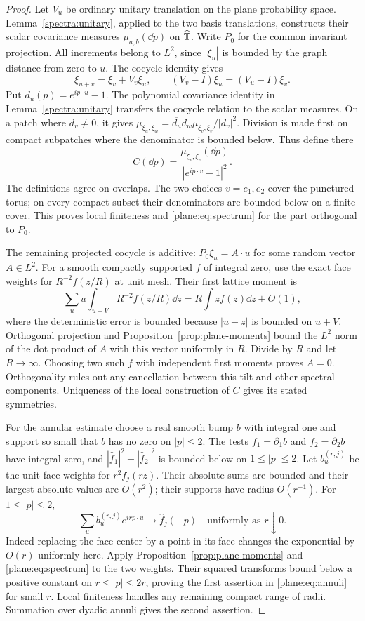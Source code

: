 \begin{proof}
Let $V_u$ be ordinary unitary translation on the plane probability space.
Lemma~\ref{spectra:unitary}, applied to the two basis translations,
constructs their scalar covariance measures $\mu_{a,b}(\dd p)$ on
$\widehat{\mathbb T}$.  Write $P_0$ for the common invariant projection.
All increments belong to $L^2$, since
$|\xi_u|$ is bounded by the graph distance from zero to $u$.  The cocycle
identity gives
\[
 \xi_{u+v}=\xi_v+V_v\xi_u,
 \qquad (V_v-I)\xi_u=(V_u-I)\xi_v.
\]
Put $d_u(p)=e^{ip\cdot u}-1$.  The polynomial covariance identity in
Lemma~\ref{spectra:unitary} transfers the cocycle relation to the scalar
measures.  On a patch where $d_v\ne0$, it gives
$\mu_{\xi_u,\xi_w}=\overline{d_u}d_w
\mu_{\xi_v,\xi_v}/|d_v|^2$.  Division is made first on compact
subpatches where the denominator is bounded below.  Thus define there
\[
 C(\dd p)=
 \frac{\mu_{\xi_v,\xi_v}(\dd p)}
      {|e^{ip\cdot v}-1|^2}.
\]
The definitions agree on overlaps.  The two choices $v=e_1,e_2$ cover
the punctured torus; on every compact subset their denominators are
bounded below on a finite cover.  This proves local finiteness and
\eqref{plane:eq:spectrum} for the part orthogonal to $P_0$.

The remaining projected cocycle is additive:
$P_0\xi_u=A\cdot u$ for some random vector $A\in L^2$.
For a smooth compactly supported $f$ of integral zero, use the exact
face weights for $R^{-2}f(z/R)$ at unit mesh.  Their first lattice moment is
\[
 \sum_u u\int_{u+V}R^{-2}f(z/R)\dd z
       =R\int zf(z)\dd z+O(1),
\]
where the deterministic error is bounded because $|u-z|$ is bounded
on $u+V$.  Orthogonal projection and Proposition~\ref{prop:plane-moments}
bound the $L^2$ norm of the dot product of $A$ with this vector uniformly
in $R$.  Divide by $R$ and let $R\to\infty$.  Choosing two such $f$ with
independent first moments proves $A=0$.  Orthogonality rules out any
cancellation between this tilt and other spectral components.
Uniqueness of the local construction of $C$ gives its stated symmetries.

For the annular estimate choose a real smooth bump $b$ with integral one
and support so small that $\widehat b$ has no zero on $|p|\le2$.
The tests $f_1=\partial_1b$ and $f_2=\partial_2b$ have integral zero, and
$|\widehat f_1|^2+|\widehat f_2|^2$ is bounded below on
$1\le|p|\le2$.  Let $b^{(r,j)}_u$ be the unit-face weights for
$r^2f_j(rz)$.  Their absolute sums are bounded and their largest
absolute values are $O(r^2)$; their supports have radius $O(r^{-1})$.
For $1\le|p|\le2$,
\[
 \sum_u b^{(r,j)}_ue^{irp\cdot u}\longrightarrow\widehat f_j(-p)
 \quad\text{uniformly as }r\downarrow0.
\]
Indeed replacing the face center by a point in its face changes the
exponential by $O(r)$ uniformly here.  Apply
Proposition~\ref{prop:plane-moments} and \eqref{plane:eq:spectrum} to
the two weights.  Their squared transforms bound below a positive
constant on $r\le|p|\le2r$, proving the first assertion in
\eqref{plane:eq:annuli} for small $r$.  Local finiteness handles any
remaining compact range of radii.  Summation over dyadic annuli gives
the second assertion.
\end{proof}

